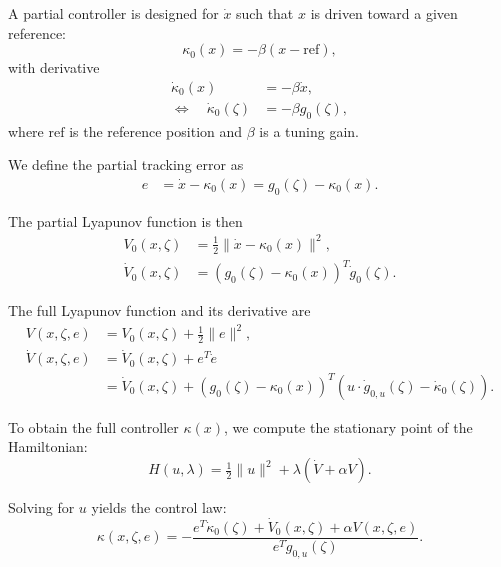 \documentclass{article}
\begin{document}
    A partial controller is designed for $\dot{x}$ such that $x$ is driven toward a given reference:
    \begin{equation*}
        \kappa_0(x) = -\beta(x - \text{ref}),
    \end{equation*}
    with derivative
    \begin{align*}
        \dot{\kappa}_0(x) &= -\beta \dot{x}, \\
        \Leftrightarrow\quad
        \dot{\kappa}_0(\zeta) &= -\beta g_0(\zeta),
    \end{align*}
    where $\text{ref}$ is the reference position and $\beta$ is a tuning gain.

    We define the partial tracking error as
    \begin{align*}
        e &= \dot{x} - \kappa_0(x)
        = g_0(\zeta) - \kappa_0(x).
    \end{align*}

    The partial Lyapunov function is then
    \begin{align*}
        V_0(x,\zeta) &= \tfrac{1}{2} \|\dot{x} - \kappa_0(x)\|^2, \\
        \dot{V}_0(x,\zeta) &= (g_0(\zeta) - \kappa_0(x))^T \dot{g}_0(\zeta).
    \end{align*}

    The full Lyapunov function and its derivative are
    \begin{align*}
        V(x,\zeta,e) &= V_0(x,\zeta) + \tfrac{1}{2}\|e\|^2, \\
        \dot{V}(x,\zeta,e) &= \dot{V}_0(x,\zeta) + e^T \dot{e} \\
        &= \dot{V}_0(x,\zeta) 
        + (g_0(\zeta) - \kappa_0(x))^T 
        \left( u \cdot \dot{g}_{0,u}(\zeta) - \dot{\kappa}_0(\zeta) \right).
    \end{align*}

    To obtain the full controller $\kappa(x)$, we compute the stationary point of the Hamiltonian:
    \begin{equation*}
        H(u,\lambda) = \tfrac{1}{2}\|u\|^2 + \lambda(\dot{V} + \alpha V).
    \end{equation*}

    Solving for $u$ yields the control law:
    \begin{equation*}
        \kappa(x,\zeta,e)
        = -\frac{e^T \dot{\kappa}_0(\zeta) + \dot{V}_0(x,\zeta) + \alpha V(x,\zeta,e)}
        {e^T \dot{g}_{0,u}(\zeta)}.
    \end{equation*}
\end{document}
